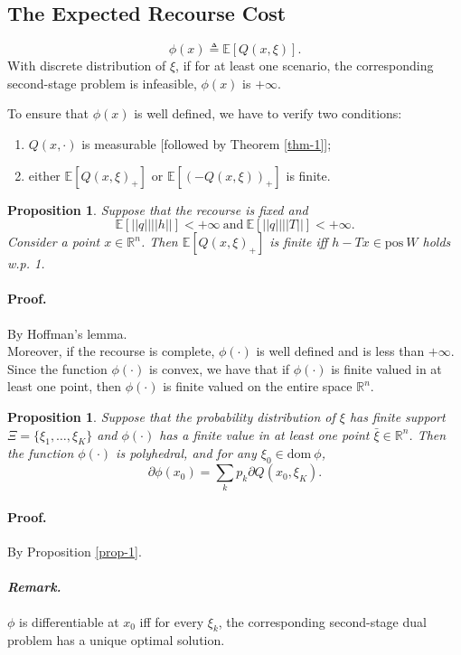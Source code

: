 \documentclass[a4pper,11pt]{article}
\newtheorem{prop}[thm]{Proposition}
\begin{document}
\subsection{The Expected Recourse Cost}
$$\phi(x)\triangleq \mathbb E[Q(x,\xi)].$$
With discrete distribution of $\xi$, if for at least one scenario, the corresponding second-stage problem is infeasible, $\phi(x)$ is $+\infty$.

To ensure that $\phi(x)$ is well defined, we have to verify two conditions:
\begin{enumerate}
    \item $Q(x,\cdot)$ is measurable [followed by Theorem \ref{thm-1}];
    \item either $\mathbb E[Q(x,\xi)_+]$ or $\mathbb E[(-Q(x,\xi))_+]$  is finite.
\end{enumerate}
\begin{prop}
    Suppose that the recourse is fixed and
    $$\mathbb E[||q||||h||]<+\infty \ \text{and} \ \mathbb E[||q||||T||]<+\infty.$$
    Consider a point $x\in \mathbb R^n$. Then $\mathbb E[Q(x,\xi)_+]$ is finite iff $h-Tx\in \text{pos}\ W$ holds w.p. 1.
\end{prop}
\paragraph{Proof.} By Hoffman's lemma.\\

Moreover, if the recourse is complete, $\phi(\cdot)$ is well deﬁned and is less than $+\infty$. Since the function $\phi(\cdot)$ is convex, we have that if $\phi(\cdot)$ is ﬁnite valued in at least one point, then $\phi(\cdot)$ is ﬁnite valued on the entire space $\mathbb R^n$.
\begin{prop}
    Suppose that the probability distribution of $\xi$ has finite support $\Xi=\{\xi_1,\dots, \xi_K\}$ and $\phi(\cdot)$ has a finite value in at least one point $\bar \xi\in \mathbb R^n$. Then the function $\phi(\cdot)$ is polyhedral, and for any $\xi_0\in \text{dom} \ \phi$,
    $$\partial \phi(x_0)=\sum_{k}p_k\partial Q(x_0,\xi_K).$$
\end{prop}
\paragraph{Proof.} By Proposition \ref{prop-1}.
\paragraph{\textit{Remark.}} $\phi$ is differentiable at $x_0$ iff for every $\xi_k$, the corresponding second-stage dual problem has a unique optimal solution.
\end{document}
